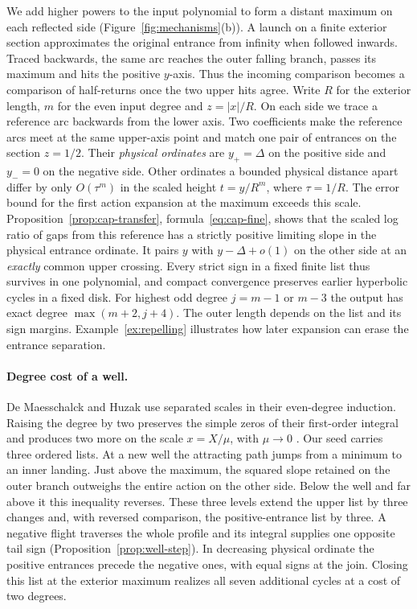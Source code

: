 \documentclass[11pt]{article}
\begin{document}
We add higher powers to the input polynomial to form a distant
maximum on each reflected side (Figure~\ref{fig:mechanisms}(b)). A
launch on a finite exterior section approximates the original entrance
from infinity when followed inwards. Traced backwards, the same arc
reaches the outer falling branch, passes its maximum and hits the
positive $y$-axis. Thus the incoming comparison becomes a comparison
of half-returns once the two upper hits agree. Write $R$ for the
exterior length, $m$ for the even input degree and $z=|x|/R$. On each side
we trace a reference arc backwards from the lower axis. Two
coefficients make the reference arcs meet at the same upper-axis point
and match one pair of entrances on the section $z=1/2$. Their
\emph{physical ordinates} are $y_+=\Delta$ on the positive side
and $y_-=0$ on the negative side. Other ordinates a bounded physical
distance apart differ by only $O(\tau^m)$ in the scaled height
$t=y/R^m$, where $\tau=1/R$.
The error bound for the first action expansion at the maximum exceeds this scale.
Proposition~\ref{prop:cap-transfer}, formula~\eqref{eq:cap-fine},
shows that the scaled log ratio of gaps from this reference has a
strictly positive limiting slope in the physical entrance ordinate.
It pairs $y$ with $y-\Delta+o(1)$ on the other side at an \emph{exactly}
common upper crossing. Every strict sign in a fixed finite list thus
survives in one polynomial, and compact convergence preserves earlier
hyperbolic cycles in a fixed disk. For highest odd degree $j=m-1$
or $m-3$ the output has exact degree
$\max(m+2,j+4)$. The outer length depends on the list and its sign
margins. Example~\ref{ex:repelling} illustrates how later expansion
can erase the entrance separation.



\paragraph{Degree cost of a well.}
De Maesschalck and Huzak use separated scales in their
even-degree induction. Raising the degree by two preserves the simple
zeros of their first-order integral and produces two more on the scale
$x=X/\mu$, with $\mu\to0$
\cite[\S3.1, Lemma~1]{DMH2015}.
Our seed carries three ordered lists. At a new well the attracting path
jumps from a minimum to an inner landing. Just above the maximum, the
squared slope retained on the outer branch outweighs the entire
action on the other side. Below the well and far above it this
inequality reverses. These three levels extend the upper list by
three changes and, with reversed comparison, the positive-entrance
list by three. A negative flight traverses the whole profile and its
integral supplies one opposite tail sign
(Proposition~\ref{prop:well-step}). In decreasing physical ordinate the
positive entrances precede the negative ones, with equal signs at the
join. Closing this list at the exterior maximum realizes all seven
additional cycles at a cost of two degrees.
\end{document}
